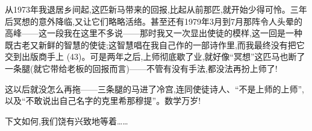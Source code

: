 从1973年我退居乡间起,这匹新马带来的回报,比起从前那匹,就开始少得可怜。三年后冥想的意外降临,又让它们略略活络。甚至还有1979年3月到7月那阵令人头晕的高峰——这一段我在这里不多说——那时我又一次显出使徒的模样,这一回是一种既古老又新鲜的智慧的使徒;这智慧唱在我自己作的一部诗作里,而我最终没有把它交到出版商手上 (43)。可是两年之后,上师彻底歇了业,就好像“冥想”这匹马也断了一条腿(就它带给老板的回报而言)——不管有没有手法,都没法再扮上师了!

 这以后就没怎么再拖——三条腿的马进了冷宫,连同使徒诗人、“不是上师的上师”,以及“不敢说出自己名字的克里希那穆提”。数学万岁!

下文如何,我们饶有兴致地等着……



